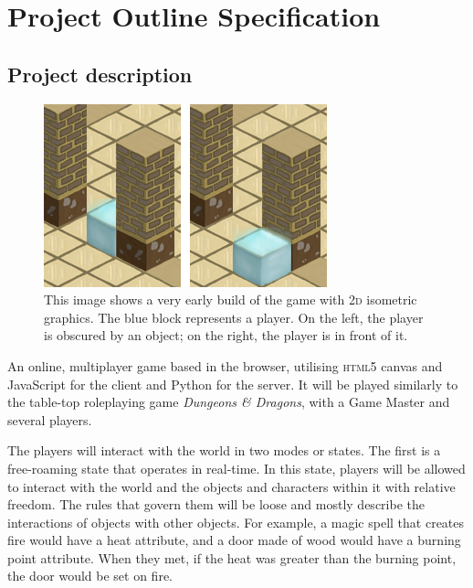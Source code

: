 \chapter{Project Outline Specification}\label{appendix:projectoutline}

\section{Project description}

\begin{figure}
\centering
	\includegraphics[scale=0.7]{Appendix4/figures/figure-1.png}
	\caption{This image shows a very early build of the game with \textsc{2d} isometric graphics. The blue block represents a player. On the left, the player is obscured by an object; on the right, the player is in front of it.\label{figure_1}}
\end{figure}

An online, multiplayer game based in the browser, utilising \textsc{html5} canvas and JavaScript for the client and Python for the server. It will be played similarly to the table-top roleplaying game \textit{Dungeons \& Dragons}, with a Game Master and several players.

The players will interact with the world in two modes or states. The first is a free-roaming state that operates in real-time. In this state, players will be allowed to interact with the world and the objects and characters within it with relative freedom. The rules that govern them will be loose and mostly describe the interactions of objects with other objects. For example, a magic spell that creates fire would have a heat attribute, and a door made of wood would have a burning point attribute. When they met, if the heat was greater than the burning point, the door would be set on fire.

